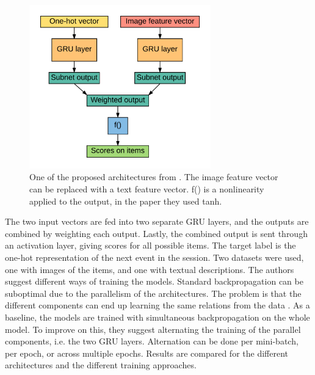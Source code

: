 \begin{figure}[htp]
	\centering
	\includegraphics[width=0.7\textwidth]{fig/parallell-rnn.png}
	\caption{One of the proposed architectures from \cite{Hidasi:2016:PRN:2959100.2959167}. The image feature vector can be replaced with a text feature vector. f() is a nonlinearity applied to the output, in the paper they used tanh.}
	\label{fig:parallell-rnn}
\end{figure}

The two input vectors are fed into two separate GRU layers, and the outputs are combined by weighting each output. Lastly, the combined output is sent through an activation layer, giving scores for all possible items. The target label is the one-hot representation of the next event in the session. Two datasets were used, one with images of the items, and one with textual descriptions. The authors suggest different ways of training the models. Standard backpropagation can be suboptimal due to the parallelism of the architectures. The problem is that the different components can end up learning the same relations from the data \cite{Hidasi:2016:PRN:2959100.2959167}. As a baseline, the models are trained with simultaneous backpropagation on the whole model. To improve on this, they suggest alternating the training of the parallel components, i.e. the two GRU layers. Alternation can be done per mini-batch, per epoch, or across multiple epochs. Results are compared for the different architectures and the different training approaches.

